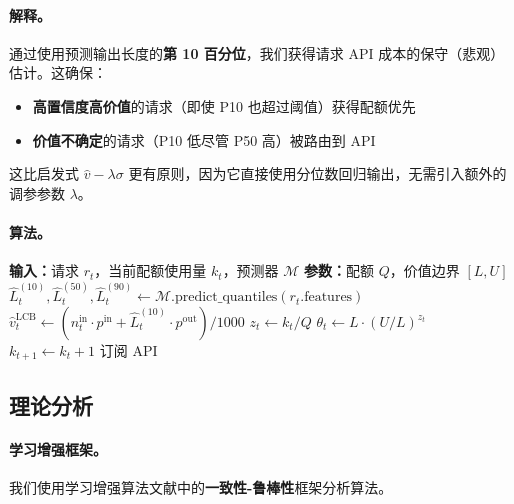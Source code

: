 \documentclass[11pt]{article}
\begin{document}
\paragraph{解释。}
通过使用预测输出长度的\textbf{第 10 百分位}，我们获得请求 API 成本的保守（悲观）估计。这确保：
\begin{itemize}
  \item \textbf{高置信度高价值}的请求（即使 P10 也超过阈值）获得配额优先
  \item \textbf{价值不确定}的请求（P10 低尽管 P50 高）被路由到 API
\end{itemize}

这比启发式 $\hat{v} - \lambda \sigma$ 更有原则，因为它直接使用分位数回归输出，无需引入额外的调参参数 $\lambda$。

\paragraph{算法。}

\begin{algorithm}[H]
\caption{学习增强原始-对偶路由}
\begin{algorithmic}[1]
\STATE \textbf{输入：}请求 $r_t$，当前配额使用量 $k_t$，预测器 $\mathcal{M}$
\STATE \textbf{参数：}配额 $Q$，价值边界 $[L, U]$
\STATE
\STATE {}
\STATE $\hat{L}^{(10)}_t, \hat{L}^{(50)}_t, \hat{L}^{(90)}_t \gets \mathcal{M}.\text{predict\_quantiles}(r_t.\text{features})$
\STATE
\STATE {}
\STATE $\hat{v}^{\text{LCB}}_t \gets (n^{\text{in}}_t \cdot p^{\text{in}} + \hat{L}^{(10)}_t \cdot p^{\text{out}}) / 1000$
\STATE
\STATE {}
\STATE $z_t \gets k_t / Q$
\STATE $\theta_t \gets L \cdot (U/L)^{z_t}$
\STATE
\STATE {}
    \STATE $k_{t+1} \gets k_t + 1$
    \RETURN 订阅
\ELSE
    \RETURN API
\ENDIF
\end{algorithmic}
\end{algorithm}

\subsection{理论分析}

\paragraph{学习增强框架。}
我们使用学习增强算法文献中的\textbf{一致性-鲁棒性}框架分析算法。
\end{document}
